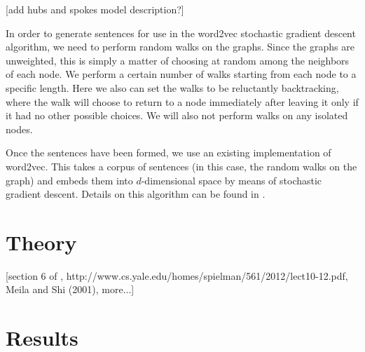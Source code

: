 \documentclass{article}
\begin{document}
[add hubs and spokes model description?]

In order to generate sentences for use in the word2vec stochastic gradient descent algorithm, we need to perform random walks on the graphs. Since the graphs are unweighted, this is simply a matter of choosing at random among the neighbors of each node. We perform a certain number of walks starting from each node to a specific length. Here we also can set the walks to be reluctantly backtracking, where the walk will choose to return to a node immediately after leaving it only if it had no other possible choices. We will also not perform walks on any isolated nodes.

Once the sentences have been formed, we use an existing implementation of word2vec\cite{word2vec}. This takes a corpus of sentences (in this case, the random walks on the graph) and embeds them into $d$-dimensional space by means of stochastic gradient descent. Details on this algorithm can be found in \cite{word2vec}.

\section{Theory}

[section 6 of \cite{Luxburg}, http://www.cs.yale.edu/homes/spielman/561/2012/lect10-12.pdf, Meila and Shi (2001), more...]

\section{Results}
\end{document}
